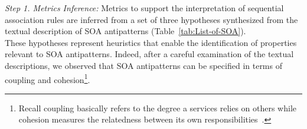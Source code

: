\noindent \emph{Step 1. Metrics Inference:} Metrics to support the interpretation of sequential association rules are inferred from a set of three hypotheses synthesized from the textual description of SOA antipatterns (Table~\ref{tab:List-of-SOA}).
\vspace{0.15cm}
\\
\noindent These hypotheses represent heuristics that enable the identification of  properties relevant to SOA antipatterns. Indeed, after a careful examination of the textual descriptions, we observed that SOA antipatterns can be specified in terms of coupling and cohesion\footnote{Recall coupling basically refers to the degree a services relies on others while cohesion measures the relatedness between its own responsibilities~\cite{stevens1974structured}.}.








